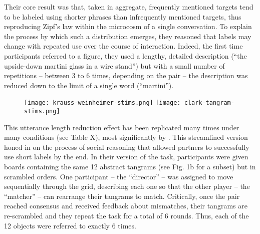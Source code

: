 \documentclass[11pt, floatsintext, jou]{apa6}
\begin{document}
Their core result was that, taken in aggregate, frequently mentioned targets tend to be labeled using shorter phrases than infrequently mentioned targets, thus reproducing Zipf's law within the microcosm of a single conversation. To explain the process by which such a distribution emerges, they reasoned that labels may change with repeated use over the course of interaction. Indeed, the first time participants referred to a figure, they used a lengthy, detailed description (``the upside-down martini glass in a wire stand'') but with a small number of repetitions -- between 3 to 6 times, depending on the pair -- the description was reduced down to the limit of a single word (``martini''). 

\begin{figure}
\centering
\texttt{[image: krauss-weinheimer-stims.png]}
\texttt{[image: clark-tangram-stims.png]}
\caption{}
\end{figure}

This utterance length reduction effect has been replicated many times under many conditions (see Table X), most significantly by . This streamlined version honed in on the process of social reasoning that allowed partners to successfully use short labels by the end. In their version of the task, participants were given boards containing the same 12 abstract tangrams (see Fig. 1b for a subset) but in scrambled orders. One participant -- the ``director'' -- was assigned to move sequentially through the grid, describing each one so that the other player -- the ``matcher'' -- can rearrange their tangrams to match. Critically, once the pair reached consensus and received feedback about mismatches, their tangrams are re-scrambled and they repeat the task for a total of 6 rounds. Thus, each of the 12 objects were referred to exactly 6 times. 

\end{document}
